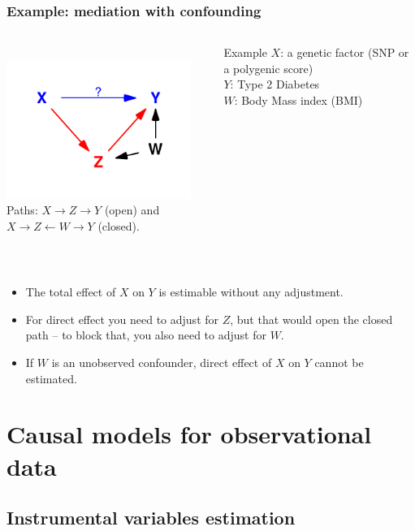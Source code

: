 \documentclass[10pt,dvipsnames,t,handout%
,aspectratio=169%
]{beamer}%
\begin{document}
\begin{frame}
\frametitle{Example: mediation with confounding}
\begin{columns}
	\begin{column}{6cm}
\mbox{ }\\[-1cm]
\includegraphics[width=6cm]{mediation_conf}\\[-0.3cm]
Paths:
$X \rightarrow Z \rightarrow Y$ (open) and $X \rightarrow Z \leftarrow W \rightarrow Y$ (closed).
	\end{column}
	\begin{column}{6cm}
		\begin{block}{Example}
			$X$: a genetic factor (SNP or a polygenic score) \\
			$Y$: Type 2 Diabetes \\
			$W$: Body Mass index (BMI) 
		\end{block}
	\end{column}
\end{columns}
\mbox{ }\\[0.5cm]
\begin{itemize}
	\item The total effect of $X$ on $Y$ is estimable without any adjustment.
	\item For direct effect you need to adjust for $Z$, but that would open the closed path -- to block that, you also need to adjust for $W$. 
	\item If $W$ is an unobserved confounder, direct effect of $X$ on $Y$ cannot be estimated. 
\end{itemize} 
 
\end{frame}

\section{Causal models for observational data}
\subsection{Instrumental variables estimation}
\end{document}
